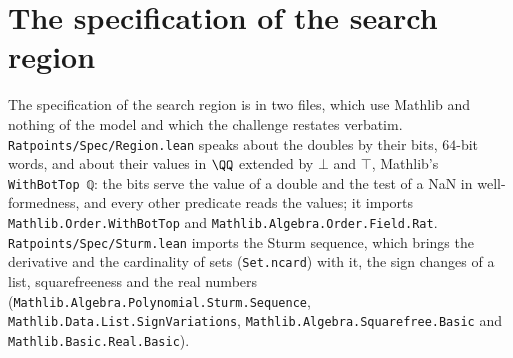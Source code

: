 \section{The specification of the search region}\label{sec:regionSpec}

The specification of the search region is in two files, which use Mathlib and nothing of the model
and which the challenge restates verbatim. \verb|Ratpoints/Spec/Region.lean| speaks about the
doubles by their bits, $64$-bit words, and about their values in $\QQ$ extended by $\bot$ and
$\top$, Mathlib's \verb|WithBotTop ℚ|: the bits serve the value of a double and the test of a NaN in
well-formedness, and every other predicate reads the values; it imports
\verb|Mathlib.Order.WithBotTop| and \verb|Mathlib.Algebra.Order.Field.Rat|.
\verb|Ratpoints/Spec/Sturm.lean| imports the Sturm sequence, which brings the derivative and the
cardinality of sets (\verb|Set.ncard|) with it, the sign changes of a list, squarefreeness and the
real numbers (\verb|Mathlib.Algebra.Polynomial.Sturm.Sequence|,
\verb|Mathlib.Data.List.SignVariations|, \verb|Mathlib.Algebra.Squarefree.Basic| and
\verb|Mathlib.Basic.Real.Basic|).

